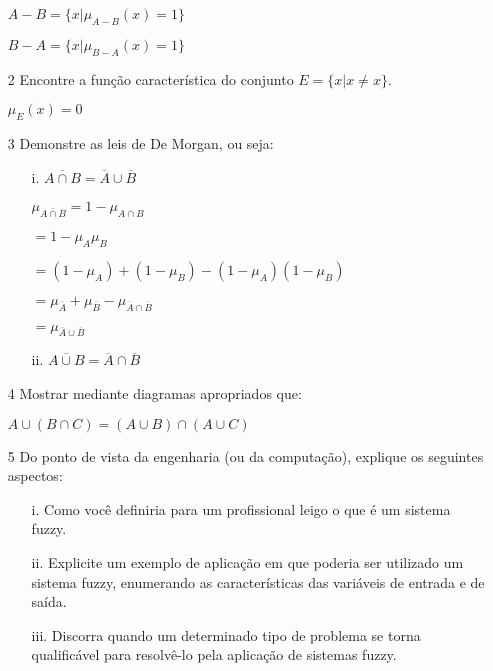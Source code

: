 \documentclass{report}
\begin{document}
\begin{enumerate}
$A - B = \lbrace x \vert \mu_{A - B }(x) = 1 \rbrace$

$B - A = \lbrace x \vert \mu_{B - A }(x) = 1 \rbrace$

\item[2] Encontre a função característica do conjunto $E = \{ x | x \neq x \}$.

$ \mu_E(x) = 0$ 

\item[3] Demonstre as leis de De Morgan, ou seja:

\begin{enumerate}
    \item[i.] $\overline{A \cap B} = \overline{A} \cup \overline{B}$

    $\mu_{\overline{A \cap B}} = 1 - \mu_{A \cap B} $
    
\hspace{0.9 cm}    $ = 1 - \mu_A \mu_B$

 \hspace{0.9 cm}   $ = (1 - \mu_A) + (1 - \mu_B) - (1 - \mu_A)(1-\mu_B)$

 \hspace{0.9 cm}   $ = \mu_{\overline{A}} + \mu_{\overline{B}} - \mu_{\overline{A}\cap\overline{B}}$

\hspace{0.9 cm}  $ = \mu_{\overline{A}\cup\overline{B}} $ 

    \item[ii.] $\overline{A \cup B} = \overline{A} \cap \overline{B}$

\end{enumerate}


\item[4] Mostrar mediante diagramas apropriados que:

$A \cup (B \cap C) = (A \cup B) \cap (A \cup C)$

\item[5] Do ponto de vista da engenharia (ou da computação), explique os seguintes aspectos:

\begin{enumerate}
\item[i.] Como você definiria para um profissional leigo o que é um sistema fuzzy.

\item[ii.] Explicite um exemplo de aplicação em que poderia ser utilizado um sistema fuzzy, 
enumerando as características das variáveis de entrada e de saída.

\item[iii.] Discorra quando um determinado tipo de problema se torna qualificável para 
resolvê-lo pela aplicação de sistemas fuzzy.
\end{enumerate}

\end{enumerate}
\end{document}
